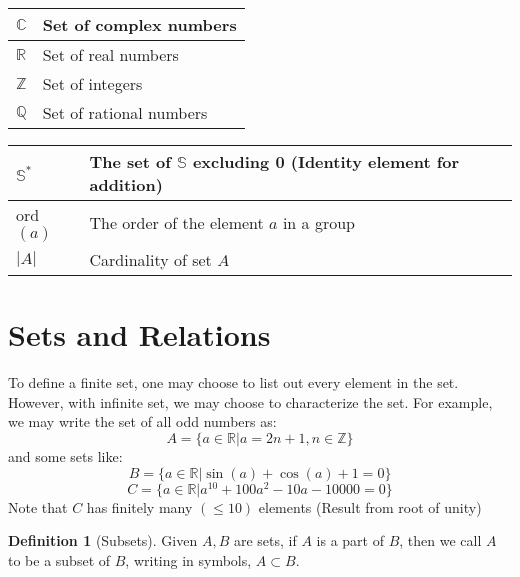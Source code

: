 \documentclass{article}
\theoremstyle{MyNonumberplain}
\theoremstyle{break}
\newcommand{\R}{\mathbb{R}}
\newcommand{\Q}{\mathbb{Q}}
\newcommand{\Z}{\mathbb{Z}}
\newcommand{\C}{\mathbb{C}}
\theoremstyle{break}
\theoremstyle{break}
\theoremstyle{definition}
\theoremstyle{break}
\newtheorem{definition}{Definition}[section]
\begin{document}
\begin{center}

    \begin{tabular}{|l|l|}
        \hline
        $\C$ & Set of complex numbers \\ \hline
        $\R$ & Set of real numbers \\ \hline
        $\Z$ & Set of integers \\ \hline
        $\Q$ & Set of rational numbers \\ \hline
    \end{tabular}
\end{center}
\begin{center}
    
    \begin{tabular}{|l|l|}
        \hline
        $\mathbb{S}^{*}$ & The set of $\mathbb{S}$ excluding 0 (Identity element for addition) \\ \hline
        ord$(a)$                                       & The order of the element $a$ in a group \\ \hline
        $|A|$                                          & Cardinality of set $A$ \\
        \hline                                                           
    \end{tabular}

\end{center}


\newpage

\tableofcontents

\newpage

\setcounter{section}{-1}

\section{Sets and Relations}

To define a finite set, one may choose to list out every element in the set.\bigskip
However, with infinite set, we may choose to characterize the set.\bigskip
For example, we may write the set of all odd numbers as:
        $$A=\{a\in\R|a=2n+1,n\in\Z\}$$
and some sets like:
        $$B=\{a\in\R|\sin(a)+\cos(a)+1=0\}$$
        $$C=\{a\in\R|a^{10}+100a^2-10a-10000=0\}$$
Note that $C$ has finitely many $(\leq 10)$ elements (Result from root of unity)

\begin{defbox}
    \begin{definition}[Subsets]
        Given $A, B$ are sets, if $A$ is a part of $B$, then we call $A$ to be a subset of $B$,
        writing in symbols, $A \subset B$.
    \end{definition}    
\end{defbox}
\end{document}
